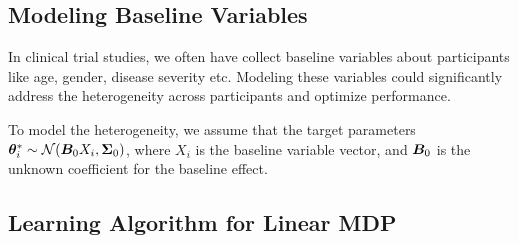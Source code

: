 \documentclass{article}
\newcommand{\sam}[1]{
  {\color{blue} [SAM: {#1}]}
 }
\begin{document}
\subsection{Modeling Baseline Variables}

In clinical trial studies, we often have collect baseline variables about participants like  age, gender, disease severity etc. Modeling these variables could significantly address the heterogeneity across participants and optimize performance.


To model the heterogeneity, we assume that the target parameters ${\bm{\theta}}_i^* \sim {\mathcal{N}}({\bm{B}}_0 X_i, {\bm{\Sigma}}_0)$, where $X_i$ is the baseline variable vector, and ${\bm{B}}_0$ is the unknown coefficient for the baseline effect. 




\subsection{Learning Algorithm for Linear MDP}


\end{document}
